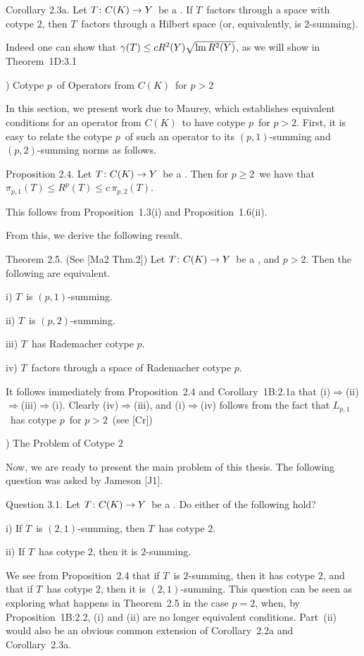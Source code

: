 \proclaim Corollary 2.3a. Let $T\colon C(K)\to Y$\ be a \blotaBs. If\/ $T$\ factors
through
a space with cotype $2$,
then $T$\ factors through a Hilbert space (or, equivalently, is $2$-summing).
 
Indeed one can show that $\gamma(T) \le c R^2(Y) \sqrt{\mathop{\rm lm}\nolimits R^2(Y)}$,
as we will
show in Theorem~1D:3.1
 
) Cotype $p$\ of Operators from $C(K)$\ for $p>2$
 
In this section, we present work due to Maurey, which establishes
equivalent conditions for an operator from $C(K)$\ to have cotype
$p$\ for
$p>2$. First, it is easy to relate the cotype $p$\
of such an operator to its $(p,1)$-summing and $(p,2)$-summing norms
as
follows.
 
\proclaim Proposition 2.4. Let $T\colon C(K)\to Y$\ be a \blotaBs. Then for $p\ge2$\
we have
that $\pi_{p,1}(T) \le R^p(T) \le c\, \pi_{p,2}(T)$.
 
\Proof This follows from Proposition~1.3(i) and
Proposition~1.6(ii).
\endproof
 
From this, we derive the following result.
 
\proclaim Theorem 2.5. (See [Ma2 Thm.2]) Let $T\colon C(K)\to Y$\ be a \blotaBs,
and $p>2$. Then the
following are equivalent.
\item{i)} $T$\ is $(p,1)$-summing.
\item{ii)} $T$\ is $(p,2)$-summing.
\item{iii)} $T$\ has Rademacher cotype $p$.
\item {iv)} $T$\ factors through a space of Rademacher cotype $p$.
 
\Proof It follows immediately from Proposition~2.4 and Corollary~1B:2.1a
that
(i)$\Rightarrow$(ii)$\Rightarrow$(iii)$\Rightarrow$(i). Clearly
(iv)$\Rightarrow$(iii), and (i)$\Rightarrow$(iv) follows from the
fact that
$L_{p,1}$\ has cotype $p$\ for $p>2$\ (see [Cr])
\endproof
 
) The Problem of Cotype $2$
 
Now, we are ready to present the main problem of this thesis.
The following question was asked by Jameson [J1].
 
\proclaim Question 3.1. Let $T\colon C(K)\to Y$\ be a \blotaBs. Do either of
the following
hold?
\item{i)} If $T$\ is $(2,1)$-summing, then $T$\ has cotype $2$.
\item{ii)} If $T$\ has cotype $2$, then it is $2$-summing.
 
We see from Proposition~2.4 that if $T$\ is $2$-summing, then it
has cotype $2$,
and that if $T$\ has cotype $2$, then it is $(2,1)$-summing. This
question can
be seen as exploring what happens in Theorem~2.5 in the case $p=2$,
when, by
Proposition~1B:2.2, (i) and (ii) are no longer equivalent conditions.
Part~(ii) would also be an obvious common
extension of Corollary~2.2a and Corollary~2.3a.
 
